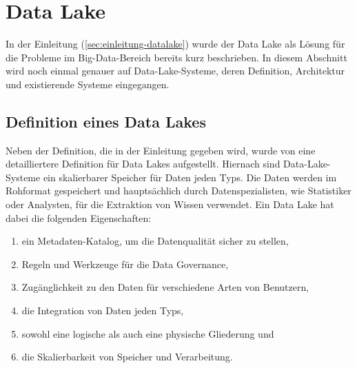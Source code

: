 \section{Data Lake}
In der Einleitung (\cref{sec:einleitung-datalake}) wurde der Data Lake als Lösung für die Probleme im Big-Data-Bereich bereits kurz beschrieben. 
In diesem Abschnitt wird noch einmal genauer auf Data-Lake-Systeme, deren Definition, Architektur und existierende Systeme eingegangen.

\subsection{Definition eines Data Lakes}
Neben der Definition, die in der Einleitung gegeben wird, wurde von \textcite{sawadogo2021data} eine detailliertere Definition für Data Lakes aufgestellt.
Hiernach sind Data-Lake-Systeme ein skalierbarer Speicher für Daten jeden Typs.
Die Daten werden im Rohformat gespeichert und hauptsächlich durch Datenspezialisten, wie Statistiker oder Analysten, für die Extraktion von Wissen verwendet.
Ein Data Lake hat dabei die folgenden Eigenschaften: \begin{enumerate}
    \item ein Metadaten-Katalog, um die Datenqualität sicher zu stellen,
    \item Regeln und Werkzeuge für die Data Governance,
    \item Zugänglichkeit zu den Daten für verschiedene Arten von Benutzern,
    \item die Integration von Daten jeden Typs,
    \item sowohl eine logische als auch eine physische Gliederung und
    \item die Skalierbarkeit von Speicher und Verarbeitung.
\end{enumerate}

